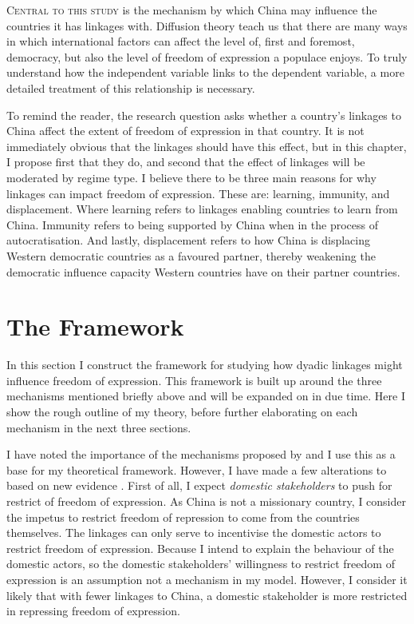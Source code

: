 \lettrine{C}{entral to this study} is the mechanism by which China may influence the countries it has linkages with. Diffusion theory teach us that there are many ways in which international factors can affect the level of, first and foremost, democracy, but also the level of freedom of expression a populace enjoys. To truly understand how the independent variable links to the dependent variable, a more detailed treatment of this relationship is necessary.

To remind the reader, the research question asks whether a country's linkages to China affect the extent of freedom of expression in that country. It is not immediately obvious that the linkages should have this effect, but in this chapter, I propose first that they do, and second that the effect of linkages will be moderated by regime type. I believe there to be three main reasons for why linkages can impact freedom of expression. These are: learning, immunity, and displacement. Where learning refers to linkages enabling countries to learn from China. Immunity refers to being supported by China when in the process of autocratisation. And lastly, displacement refers to how China is displacing Western democratic countries as a favoured partner, thereby weakening the democratic influence capacity Western countries have on their partner countries.

\section{The Framework}
In this section I construct the framework for studying how dyadic linkages might influence freedom of expression. This framework is built up around the three mechanisms mentioned briefly above and will be expanded on in due time. Here I show the rough outline of my theory, before further elaborating on each mechanism in the next three sections. 

I have noted the importance of the mechanisms proposed by \citet{tansey_ties_2017} and I use this as a base for my theoretical framework. However, I have made a few alterations to based on new evidence \citep{weyland_autocratic_2017}. First of all, I expect \textit{domestic stakeholders} to push for restrict of freedom of expression. As China is not a missionary country, I consider the impetus to restrict freedom of repression to come from the countries themselves. The linkages can only serve to incentivise the domestic actors to restrict freedom of expression. Because I intend to explain the behaviour of the domestic actors, so the domestic stakeholders' willingness to restrict freedom of expression is an assumption not a mechanism in my model. However, I consider it likely that with fewer linkages to China, a domestic stakeholder is more restricted in repressing freedom of expression.

